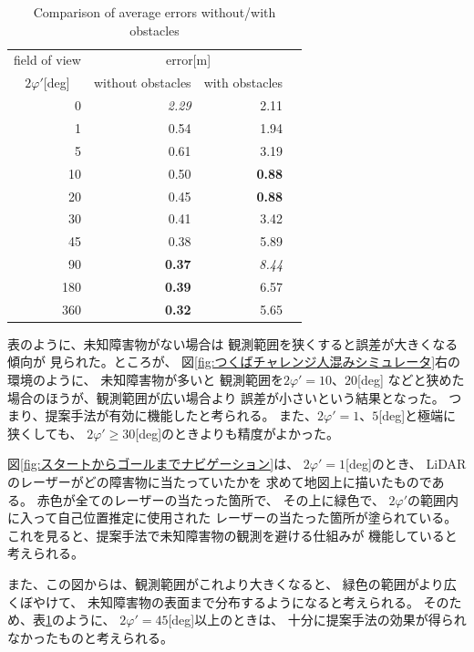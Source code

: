 \documentclass{jarticle}
\begin{document}
\begin{table}[htbp]
	\centering
	\caption{Comparison of average errors without/with obstacles}
  \label{table:error}
	\begin{small}
  \begin{tabular}{|r|r|r|r|} \hline
	  field of view & \multicolumn{2}{c|}{error[m]} \\
	  \multicolumn{1}{|c|}{$2\varphi'$[deg]}  & without obstacles & with obstacles \\ \hline \hline
	  {0}         & \textit{2.29} & 2.11 \\ \hline
	  {1}         & 0.54 &  1.94 \\ \hline
	  {5}         & 0.61 & 3.19 \\ \hline
	  {10}        & 0.50 & \textbf{0.88} \\ \hline
	  {20}        & 0.45 & \textbf{0.88} \\ \hline
	  {30}        & 0.41 & 3.42 \\ \hline
	  {45}        & 0.38 & 5.89 \\ \hline
	  {90}        & \textbf{0.37} & \textit{8.44}\\ \hline
	  {180}        & \textbf{0.39} & 6.57\\ \hline
	  {360}       & \textbf{0.32} & 5.65 \\ \hline
  \end{tabular}
	\end{small}
\end{table}


表のように、未知障害物がない場合は
観測範囲を狭くすると誤差が大きくなる傾向が
見られた。ところが、
図\ref{fig:つくばチャレンジ人混みシミュレータ}右の環境のように、
未知障害物が多いと
観測範囲を$2\varphi'=10$、$20$[deg]
などと狭めた場合のほうが、観測範囲が広い場合より
誤差が小さいという結果となった。
つまり、提案手法が有効に機能したと考られる。
また、$2\varphi'=1$、$5$[deg]と極端に狭くしても、
$2\varphi' \ge 30$[deg]のときよりも精度がよかった。


図\ref{fig:スタートからゴールまでナビゲーション}は、
$2\varphi'=1$[deg]のとき、
LiDARのレーザーがどの障害物に当たっていたかを
求めて地図上に描いたものである。
赤色が全てのレーザーの当たった箇所で、
その上に緑色で、
$2\varphi'$の範囲内に入って自己位置推定に使用された
レーザーの当たった箇所が塗られている。
これを見ると、提案手法で未知障害物の観測を避ける仕組みが
機能していると考えられる。

また、この図からは、観測範囲がこれより大きくなると、
緑色の範囲がより広くぼやけて、
未知障害物の表面まで分布するようになると考えられる。
そのため、表\ref{table:error}のように、
$2\varphi'=45$[deg]以上のときは、
十分に提案手法の効果が得られなかったものと考えられる。
\end{document}
